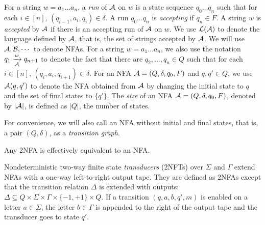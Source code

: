 \documentclass{llncs}
\begin{document}
For a string $w = a_1 \dots a_n$, a \emph{run} of $\mathcal{A}$ on $w$ is a state sequence $q_0 \dots q_n$ such that for each $i \in [n]$, $(q_{i-1}, a_i, q_i) \in \delta$. A run $q_0 \dots q_n$ is \emph{accepting} if $q_n \in F$. A string $w$ is \emph{accepted} by $\mathcal{A}$ if there is an accepting run of $\mathcal{A}$ on $w$. We use $\mathcal{L}(\mathcal{A})$ to denote the language defined by $\mathcal{A}$, that is, the set of strings accepted by $\mathcal{A}$. We will use $\mathcal{A}, \mathcal{B}, \cdots$ to denote NFAs.
For a string $w= a_1 \dots a_n$, we also use the notation $q_1 \xrightarrow[\mathcal{A}]{w} q_{n+1}$ to denote the fact that there are $q_2,\dots, q_n \in Q$ such that for each $i \in [n]$, $(q_i, a_i, q_{i+1}) \in \delta$.  For an NFA $\mathcal{A}=(Q, \delta, q_0, F)$ and $q, q' \in Q$, we use $\mathcal{A}(q,q')$ to denote the NFA obtained from $\mathcal{A}$ by changing the initial state to $q$ and the set of final states to $\{q'\}$. The \emph{size} of an NFA $\mathcal{A}=(Q, \delta, q_0, F)$, denoted by $|\mathcal{A}|$, is defined as $|Q|$, the number of states.

For convenience, we will also call an NFA without initial and final states, that is, a pair $(Q, \delta)$, as a \emph{transition graph}.


\begin{proposition}
	Any 2NFA is effectively equivalent to an NFA.
\end{proposition}

\begin{definition}
  Nondeterministic two-way finite state \emph{transducers} (2NFTs) over $\Sigma$ and $\Gamma$ extend NFAs with a one-way left-to-right output tape. They are defined as 2NFAs except that the transition relation $\Delta$ is extended with outputs: $\Delta\subseteq Q \times \Sigma \times \Gamma \times \{-1, +1\} \times  Q $. If a transition $(q, a, b, q′, m)$ is enabled on a letter $a\in \Sigma$, the letter $b\in \Gamma$ is appended to the right of
	the output tape and the transducer goes to state $q'$.
\end{definition}
\end{document}
